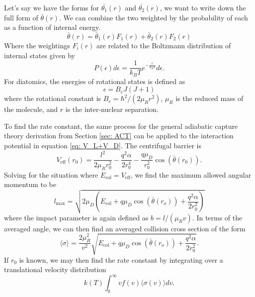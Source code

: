 Let's say we have the forms for $\bar{\theta_1}(r)$ and $\bar{\theta_2}(r)$, we want to write down the full form of $\bar{\theta}(r)$. We can combine the two weighted by the probability of each as a function of internal energy.
\begin{equation}
    \bar{\theta}(r) = \bar{\theta}_1(r) F_1(r) + \bar{\theta}_2(r) F_2(r) \label{eq: weighted theta}
\end{equation}
Where the weightings $F_i(r)$ are related to the Boltzmann distribution of internal states given by
\begin{equation*}
    P(\epsilon) d\epsilon = \frac{1}{k_BT}e^{-\frac{\epsilon}{k_BT}}d\epsilon.
\end{equation*}
For diatomics, the energies of rotational states is defined as
\begin{equation*}
    \epsilon = B_e J(J+1)
\end{equation*}
where the rotational constant is $B_e=\hbar^2/(2\mu_R r^2)$, $\mu_R$ is the reduced mass of the molecule, and $r$ is the inter-nuclear separation.

To find the rate constant, the same process for the general adiabatic capture theory derivation from Section \ref{sec: ACT} can be applied to the interaction potential in equation \ref{eq: V_L+V_D}. The centrifugal barrier is
\begin{equation*}
	V_{\mathrm{eff}}(r_0) = \dfrac{l^2}{2 \mu_R r_0^2} - \dfrac{q^2 \alpha}{2r_0^4} - \dfrac{q\mu_D}{r_0^2} \cos(\bar{\theta}(r_0)).
\end{equation*}
Solving for the situation where $E_{\mathrm{col}} = V_{\mathrm{eff}}$, we find the maximum allowed angular momentum to be
\begin{equation*}
	l_{\max} = \sqrt{2\mu_D \left(E_{\mathrm{col}} + q \mu_D \cos(\bar{\theta}(r_o)) + \dfrac{q^2 \alpha}{2 r_0^2}\right)}
\end{equation*}
where the impact parameter is again defined as $b=l/(\mu_R v)$. In terms of the averaged angle, we can then find an averaged collision cross section of the form
\begin{equation*}
	\langle \sigma \rangle = \dfrac{2 \mu_R^2}{v^2} \sqrt{E_{\mathrm{col}} + q \mu_D \cos(\bar{\theta}(r_o)) + \dfrac{q^2 \alpha}{2 r_0^2}}.
\end{equation*}
If $r_0$ is known, we may then find the rate constant by integrating over a translational velocity distribution
\begin{equation*}
	k(T) \int_0^\infty v f(v) \langle \sigma(v) \rangle dv.
\end{equation*}

